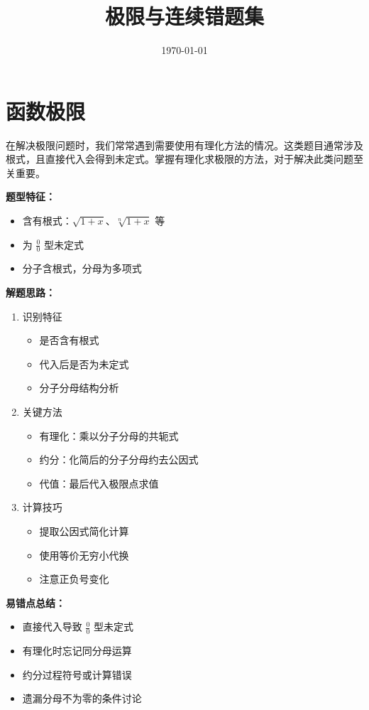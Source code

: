 \documentclass{ctexart}
\title{极限与连续错题集}
\date{\today}
\begin{document}
\maketitle

\section{函数极限}
在解决极限问题时，我们常常遇到需要使用有理化方法的情况。这类题目通常涉及根式，且直接代入会得到未定式。掌握有理化求极限的方法，对于解决此类问题至关重要。

\begin{strategy}[有理化求极限]
\textbf{题型特征：}
\begin{itemize}
    \item 含有根式：$\sqrt{1+x}$、$\sqrt[n]{1+x}$ 等
    \item 为 $\frac{0}{0}$ 型未定式
    \item 分子含根式，分母为多项式
\end{itemize}

\textbf{解题思路：}
\begin{enumerate}
    \item 识别特征
    \begin{itemize}
        \item 是否含有根式
        \item 代入后是否为未定式
        \item 分子分母结构分析
    \end{itemize}
    
    \item 关键方法
    \begin{itemize}
        \item 有理化：乘以分子分母的共轭式
        \item 约分：化简后的分子分母约去公因式
        \item 代值：最后代入极限点求值
    \end{itemize}
    
    \item 计算技巧
    \begin{itemize}
        \item 提取公因式简化计算
        \item 使用等价无穷小代换
        \item 注意正负号变化
    \end{itemize}
\end{enumerate}

\textbf{易错点总结：}
\begin{itemize}
    \item 直接代入导致 $\frac{0}{0}$ 型未定式
    \item 有理化时忘记同分母运算
    \item 约分过程符号或计算错误
    \item 遗漏分母不为零的条件讨论
\end{itemize}
\end{strategy}
\end{document}
